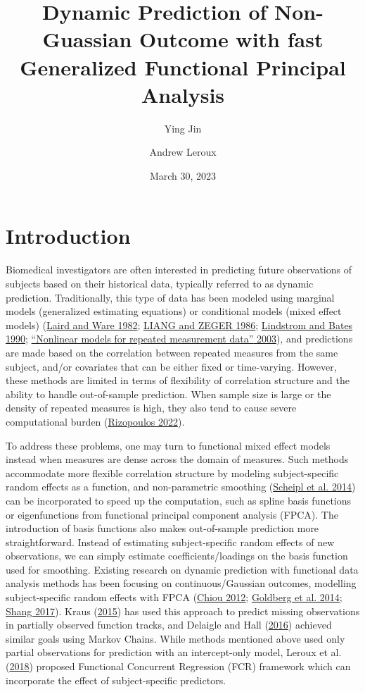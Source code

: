 \documentclass[
  11pt,
]{article}
\title{Dynamic Prediction of Non-Guassian Outcome with fast Generalized
Functional Principal Analysis}
\author{Ying Jin \and Andrew Leroux}
\date{March 30, 2023}
\begin{document}
\maketitle

\hypertarget{introduction}{%
\section{Introduction}\label{introduction}}

Biomedical investigators are often interested in predicting future
observations of subjects based on their historical data, typically
referred to as dynamic prediction. Traditionally, this type of data has
been modeled using marginal models (generalized estimating equations) or
conditional models (mixed effect models)
(\protect\hyperlink{ref-Laird1982}{Laird and Ware 1982};
\protect\hyperlink{ref-liang1986}{LIANG and ZEGER 1986};
\protect\hyperlink{ref-lindstrom1990}{Lindstrom and Bates 1990};
\protect\hyperlink{ref-davidian2003}{{``Nonlinear models for repeated
measurement data''} 2003}), and predictions are made based on the
correlation between repeated measures from the same subject, and/or
covariates that can be either fixed or time-varying. However, these
methods are limited in terms of flexibility of correlation structure and
the ability to handle out-of-sample prediction. When sample size is
large or the density of repeated measures is high, they also tend to
cause severe computational burden
(\protect\hyperlink{ref-GLMMadaptive}{Rizopoulos 2022}).

To address these problems, one may turn to functional mixed effect
models instead when measures are dense across the domain of measures.
Such methods accommodate more flexible correlation structure by modeling
subject-specific random effects as a function, and non-parametric
smoothing (\protect\hyperlink{ref-Scheipl2014}{Scheipl et al. 2014}) can
be incorporated to speed up the computation, such as spline basis
functions or eigenfunctions from functional principal component analysis
(FPCA). The introduction of basis functions also makes out-of-sample
prediction more straightforward. Instead of estimating subject-specific
random effects of new observations, we can simply estimate
coefficients/loadings on the basis function used for smoothing. Existing
research on dynamic prediction with functional data analysis methods has
been focusing on continuous/Gaussian outcomes, modelling
subject-specific random effects with FPCA
(\protect\hyperlink{ref-chiou2012}{Chiou 2012};
\protect\hyperlink{ref-goldberg2014}{Goldberg et al. 2014};
\protect\hyperlink{ref-shang2017}{Shang 2017}). Kraus
(\protect\hyperlink{ref-kraus2015}{2015}) has used this approach to
predict missing observations in partially observed function tracks, and
Delaigle and Hall (\protect\hyperlink{ref-delaigo2016}{2016}) achieved
similar goals using Markov Chains. While methods mentioned above used
only partial observations for prediction with an intercept-only model,
Leroux et al. (\protect\hyperlink{ref-leroux2016}{2018}) proposed
Functional Concurrent Regression (FCR) framework which can incorporate
the effect of subject-specific predictors.
\end{document}
